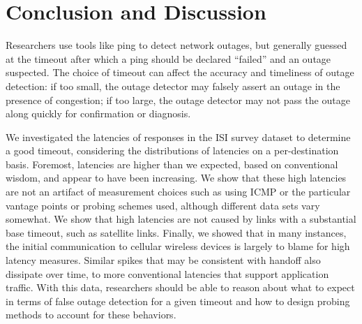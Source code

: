 

\section{Conclusion and Discussion}

Researchers use tools like ping to detect network outages,
but generally guessed at the timeout after which a ping
should be declared ``failed'' and an outage suspected.  The
choice of timeout can affect the accuracy and timeliness of
outage detection: if too small, the outage detector may
falsely assert an outage in the presence of congestion; if
too large, the outage detector may not pass the outage along
quickly for confirmation or diagnosis.

We investigated the latencies of responses in the ISI survey
dataset to determine a good timeout, considering the
distributions of latencies on a per-destination basis.
Foremost, latencies are higher than we expected, based on
conventional wisdom, and appear to have been increasing.
We show that these high latencies are not an artifact of
measurement choices such as using ICMP or the particular
vantage points or probing schemes used, although different data sets vary somewhat.
We show that high latencies are not caused by links with a substantial
base timeout, such as satellite links.  
% 
% 
Finally, we showed that in many instances, the initial communication to
cellular wireless devices is largely to blame for high latency measures.
Similar spikes that may be consistent with handoff also dissipate over time,
to more conventional latencies that support application traffic.
With this data, researchers should be able to reason about
what to expect in terms of false outage detection for a
given timeout and how to design probing methods to account for
these behaviors.

